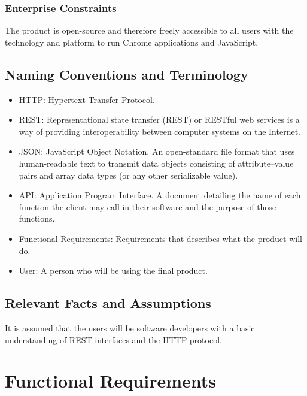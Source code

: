 \documentclass[12pt, titlepage]{article}
\begin{document}
\subsubsection{Enterprise Constraints}
The product is open-source and therefore freely accessible to all users with the technology and platform to run Chrome applications and JavaScript.

\subsection{Naming Conventions and Terminology}
\begin{itemize}
	\item HTTP: Hypertext Transfer Protocol.
	\item REST: Representational state transfer (REST) or RESTful web services is a way of providing interoperability between computer systems on the Internet.
	\item JSON: JavaScript Object Notation. An open-standard file format that uses human-readable text to transmit data objects consisting of attribute–value pairs and array data types (or any other serializable value).
	\item API: Application Program Interface. A document detailing the name of each function the client may call in their software and the purpose of those functions.
	\item Functional Requirements: Requirements that describes what the product will do.
	\item User: A person who will be using the final product.
\end{itemize}


\subsection{Relevant Facts and Assumptions}
It is assumed that the users will be software developers with a basic understanding of REST interfaces and the HTTP protocol.

\newpage
\section{Functional Requirements}
\end{document}
